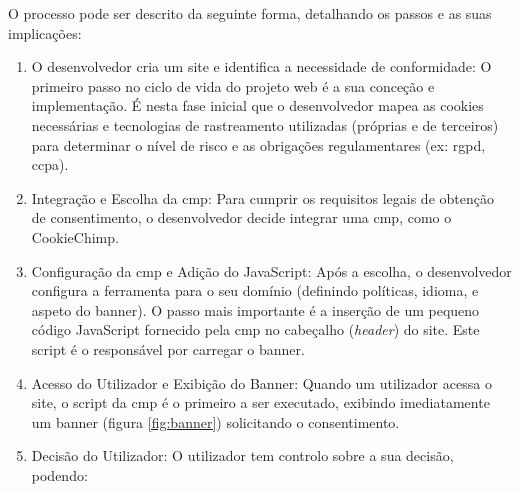 \newpage

O processo pode ser descrito da seguinte forma, detalhando os passos e as suas implicações:

\begin{enumerate}
    \item O desenvolvedor cria um site e identifica a necessidade de conformidade: O primeiro passo no ciclo de vida do projeto web é a sua conceção e implementação. É nesta fase inicial que o desenvolvedor mapea as cookies necessárias e tecnologias de rastreamento utilizadas (próprias e de terceiros) para determinar o nível de risco e as obrigações regulamentares (ex: \acrshort{rgpd}, \acrfull{ccpa}).
    \item Integração e Escolha da \acrshort{cmp}: Para cumprir os requisitos legais de obtenção de consentimento, o desenvolvedor decide integrar uma \acrshort{cmp}, como o CookieChimp.
    \item Configuração da \acrshort{cmp} e Adição do JavaScript: Após a escolha, o desenvolvedor configura a ferramenta para o seu domínio (definindo políticas, idioma, e aspeto do banner). O passo mais importante é a inserção de um pequeno código JavaScript fornecido pela \acrshort{cmp} no cabeçalho (\textit{header}) do site. Este script é o responsável por carregar o banner.
    \item Acesso do Utilizador e Exibição do Banner: Quando um utilizador acessa o site, o script da \acrshort{cmp} é o primeiro a ser executado, exibindo imediatamente um banner (figura \ref{fig:banner}) solicitando o consentimento.
    \item Decisão do Utilizador: O utilizador tem controlo sobre a sua decisão, podendo:


\end{enumerate}
